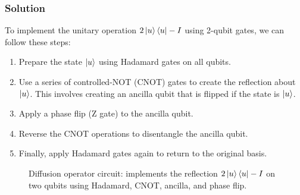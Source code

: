 \documentclass[12pt]{article} %
\begin{document}
\subsubsection*{Solution}
To implement the unitary operation \(2\ket{u}\bra{u} - I\) using 2-qubit gates, we can follow these steps:
\begin{enumerate}
    \item Prepare the state \(\ket{u}\) using Hadamard gates on all qubits.
    \item Use a series of controlled-NOT (CNOT) gates to create the reflection about \(\ket{u}\). This involves creating an ancilla qubit that is flipped if the state is \(\ket{u}\).
    \item Apply a phase flip (Z gate) to the ancilla qubit.
    \item Reverse the CNOT operations to disentangle the ancilla qubit.
    \item Finally, apply Hadamard gates again to return to the original basis.
\end{enumerate}

\begin{figure}[h]
    \centering
    \caption{Diffusion operator circuit: implements the reflection \(2\ket{u}\bra{u} - I\) on two qubits using Hadamard, CNOT, ancilla, and phase flip.}
    \label{fig:grover-circuit}
\end{figure}
\end{document}
